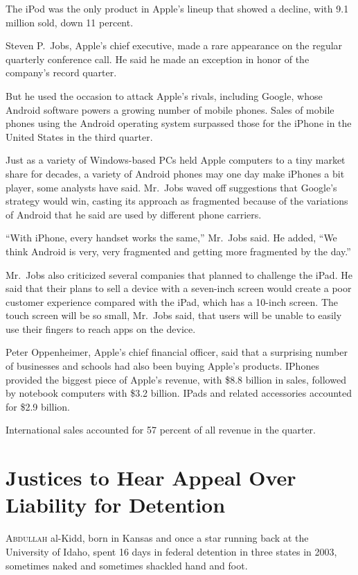 ﻿\documentclass[12pt]{article}
\begin{document}
The iPod was the only product in Apple's lineup that showed a decline, with 9.1 million sold, down
11 percent.

Steven P.~Jobs, Apple's chief executive, made a rare appearance on the regular quarterly conference
call. He said he made an exception in honor of the company's record quarter.

But he used the occasion to attack Apple's rivals, including Google, whose Android software powers a
growing number of mobile phones. Sales of mobile phones using the Android operating system surpassed
those for the iPhone in the United States in the third quarter.

Just as a variety of Windows-based PCs held Apple computers to a tiny market share for decades, a
variety of Android phones may one day make iPhones a bit player, some analysts have said. Mr.~Jobs
waved off suggestions that Google's strategy would win, casting its approach as fragmented because
of the variations of Android that he said are used by different phone carriers.

``With iPhone, every handset works the same,'' Mr.~Jobs said. He added, ``We think Android is very,
very fragmented and getting more fragmented by the day.''

Mr.~Jobs also criticized several companies that planned to challenge the iPad. He said that their
plans to sell a device with a seven-inch screen would create a poor customer experience compared
with the iPad, which has a 10-inch screen. The touch screen will be so small, Mr.~Jobs said, that
users will be unable to easily use their fingers to reach apps on the device.

Peter Oppenheimer, Apple's chief financial officer, said that a surprising number of businesses and
schools had also been buying Apple's products. IPhones provided the biggest piece of Apple's
revenue, with \$8.8 billion in sales, followed by notebook computers with \$3.2 billion. IPads and
related accessories accounted for \$2.9 billion.

International sales accounted for 57 percent of all revenue in the quarter.

\section{Justices to Hear Appeal Over Liability for Detention}

\lettrine{A}{bdullah} al-Kidd, born in Kansas and once a star running back
at the University of Idaho, spent 16 days in federal detention in three states in 2003, sometimes
naked and sometimes shackled hand and foot.
\end{document}

